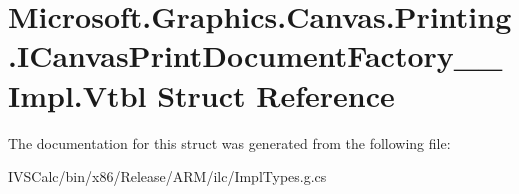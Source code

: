 \hypertarget{struct_microsoft_1_1_graphics_1_1_canvas_1_1_printing_1_1_i_canvas_print_document_factory_____impl_1_1_vtbl}{}\section{Microsoft.\+Graphics.\+Canvas.\+Printing.\+I\+Canvas\+Print\+Document\+Factory\+\_\+\+\_\+\+Impl.\+Vtbl Struct Reference}
\label{struct_microsoft_1_1_graphics_1_1_canvas_1_1_printing_1_1_i_canvas_print_document_factory_____impl_1_1_vtbl}


The documentation for this struct was generated from the following file\+:\begin{DoxyCompactItemize}
\item 
I\+V\+S\+Calc/bin/x86/\+Release/\+A\+R\+M/ilc/Impl\+Types.\+g.\+cs\end{DoxyCompactItemize}
